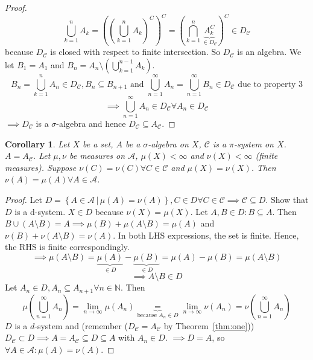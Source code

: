 \documentclass{article}
\newtheorem*{corollary}{Corollary}%
\newcommand{\setdef}[2]{\left\{\left.#1\,\right|\,#2\right\}}
\begin{document}
\begin{proof}
  \[ \bigcup_{k=1}^n A_k = \left(\left(\bigcup_{k=1}^n A_k\right)^C\right)^C = \left(\bigcap_{k=1}^n \underbrace{A_k^C}_{\in D_{\mathcal C}}\right)^C \in D_{\mathcal C} \]
  because $D_{\mathcal C}$ is closed with respect to finite intersection.
  So $D_{\mathcal C}$ is an algebra.
  We let $B_1 = A_1$ and $B_n = A_n \setminus \left(\bigcup_{k=1}^{n-1} A_k\right)$.
  \[ B_n = \bigcup_{k=1}^n A_n \in D_{\mathcal C}, B_n \subseteq B_{n+1} \text{ and } \bigcup_{n=1}^\infty A_n = \bigcup_{n=1}^\infty B_n \in D_{\mathcal C} \text{ due to property 3} \]
  \[ \implies \bigcup_{n=1}^\infty A_n \in D_{\mathcal C} \forall A_n \in D_{\mathcal C} \]
  $\implies D_{\mathcal C}$ is a $\sigma$-algebra and hence $D_{\mathcal C} \subseteq A_{\mathcal C}$.
\end{proof}

\begin{corollary}
  Let $X$ be a set, $A$ be a $\sigma$-algebra on $X$, $\mathcal C$ is a $\pi$-system on $X$.
  $A = A_{\mathcal C}$. Let $\mu, \nu$ be measures on $\mathcal A$, $\mu(X) < \infty$ and $\nu(X) < \infty$ (finite measures).
  Suppose $\nu(C) = \nu(C) \forall C \in \mathcal C$ and $\mu(X) = \nu(X)$. Then $\nu(A) = \mu(A) \forall A \in \mathcal A$.
\end{corollary}
\begin{proof}
  Let $D = \setdef{A \in \mathcal A}{\mu(A) = \nu(A)}, C \in D \forall C \in \mathcal C \implies \mathcal C \subseteq D$.
  Show that $D$ is a d-system. $X \in D$ because $\nu(X) = \mu(X)$.
  Let $A, B \in D: B \subseteq A$. Then $B \cup (A \setminus B) = A \implies \mu(B) + \mu(A \setminus B) = \mu(A)$ and 
  $\nu(B) + \nu(A \setminus B) = \nu(A)$. In both LHS expressions, the set is finite. Hence, the RHS is finite correspondingly.
  \[ \implies \mu(A \setminus B) = \underbrace{\mu(A)}_{\in D} - \underbrace{\mu(B)}_{\in D} = \mu(A) - \mu(B) = \mu(A \setminus B) \]
  \[ \implies A \setminus B \in D \]
  Let $A_n \in D, A_n \subseteq A_{n+1} \forall n \in \mathbb N$.
  Then
  \[ \mu\left(\bigcup_{n=1}^\infty A_n\right) = \lim_{n\to\infty} \mu(A_n) \underbrace{=}_{\text{because } A_n \in D} \lim_{n\to\infty} \nu(A_n) = \nu(\bigcup_{n=1}^\infty A_n) \]
  $D$ is a $d$-system and (remember ($D_{\mathcal C} = A_{\mathcal C}$ by Theorem~\ref{thm:one})) $D_{\mathcal C} \subset D \implies A = A_{\mathcal C} \subseteq D \subseteq A$ with $A_n \in D$.
  $\implies D = A$, so $\forall A \in \mathcal A: \mu(A) = \nu(A)$.
\end{proof}
\end{document}
